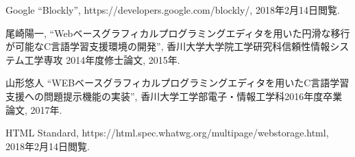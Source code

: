\documentclass{eniepaper}
\begin{document}
\begin{thebibliography}{99} %
                                  
 Google 
 ``Blockly'', https://developers.google.com/blockly/, 2018年2月14日閲覧.

 尾崎陽一,
 ``Webベースグラフィカルプログラミングエディタを用いた円滑な移行が可能なC言語学習支援環境の開発'', 香川大学大学院工学研究科信頼性情報システム工学専攻 2014年度修士論文, 2015年.
 
 山形悠人
 ``WEBベースグラフィカルプログラミングエディタを用いたC言語学習支援への問題提示機能の実装'', 香川大学工学部電子・情報工学科2016年度卒業論文, 2017年.
 
HTML Standard, https://html.spec.whatwg.org/multipage/webstorage.html, 2018年2月14日閲覧.
 

\end{thebibliography}



\insertindex %
\printindex
  
\end{document}
